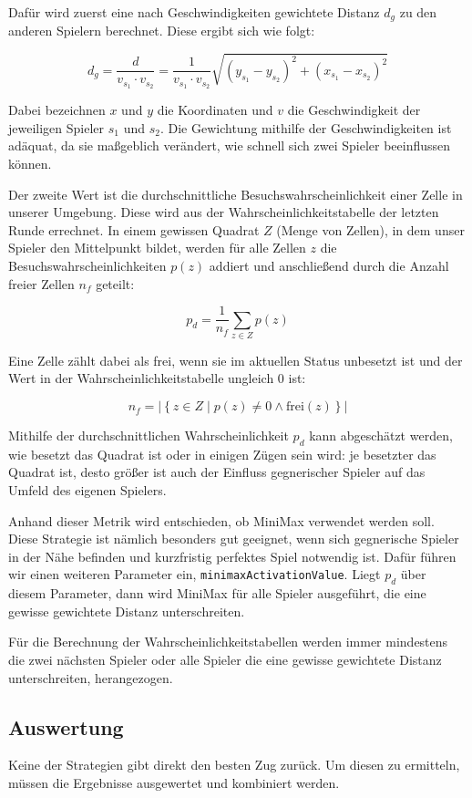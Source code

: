 \documentclass[12pt,a4paper]{article}
\begin{document}
Dafür wird zuerst eine nach Geschwindigkeiten gewichtete Distanz $d_g$ zu den anderen Spielern berechnet. Diese ergibt sich wie folgt:

\[d_g = \frac{d}{v_{s_1} \cdot v_{s_2}} = \frac{1}{v_{s_1} \cdot v_{s_2}}\sqrt{(y_{s_1}-y_{s_2})^2+(x_{s_1}-x_{s_2})^2}\]

Dabei bezeichnen $x$ und $y$ die Koordinaten und $v$ die Geschwindigkeit der jeweiligen Spieler $s_1$ und $s_2$.  Die Gewichtung mithilfe der Geschwindigkeiten ist adäquat, da sie maßgeblich verändert, wie schnell sich zwei Spieler beeinflussen können.

Der zweite Wert ist die durchschnittliche Besuchswahrscheinlichkeit einer Zelle in unserer Umgebung. Diese wird aus der Wahrscheinlichkeitstabelle der letzten Runde errechnet. In einem gewissen Quadrat $Z$ (Menge von Zellen), in dem unser Spieler den Mittelpunkt bildet, werden für alle Zellen $z$ die Besuchswahrscheinlichkeiten $p(z)$ addiert und anschließend durch die Anzahl freier Zellen $n_f$ geteilt:

\[ p_d = \frac{1}{n_f} \sum_{z \in Z}p(z) \]

Eine Zelle zählt dabei als frei, wenn sie im aktuellen Status unbesetzt ist und der Wert in der Wahrscheinlichkeitstabelle ungleich 0 ist:

\[ n_f = |\left\{z \in Z \mid p(z) \neq 0 \land \textrm{frei}(z) \right\}|\]

Mithilfe der durchschnittlichen Wahrscheinlichkeit $p_d$ kann abgeschätzt werden, wie besetzt das Quadrat ist oder in einigen Zügen sein wird: je besetzter das Quadrat ist, desto größer ist auch der Einfluss gegnerischer Spieler auf das Umfeld des eigenen Spielers. 

Anhand dieser Metrik wird entschieden, ob MiniMax verwendet werden soll. Diese Strategie ist nämlich besonders gut geeignet, wenn sich gegnerische Spieler in der Nähe befinden und kurzfristig perfektes Spiel notwendig ist. Dafür führen wir einen weiteren Parameter ein, \texttt{minimaxActivationValue}. Liegt $p_d$ über diesem Parameter, dann wird MiniMax für alle Spieler ausgeführt, die eine gewisse gewichtete Distanz unterschreiten. 

Für die Berechnung der Wahrscheinlichkeitstabellen werden immer mindestens die zwei nächsten Spieler oder alle Spieler die eine gewisse gewichtete Distanz unterschreiten, herangezogen.

\subsection{Auswertung}  \label{sec:combi-evaluation}
Keine der Strategien gibt direkt den besten Zug zurück. Um diesen zu ermitteln, müssen die Ergebnisse ausgewertet und kombiniert werden.
\end{document}
